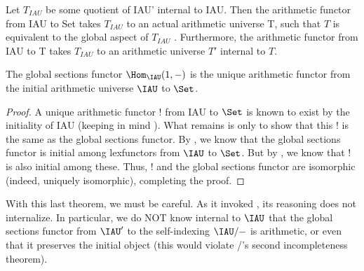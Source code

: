 Let $T_{IAU}$ be some quotient of IAU' internal to IAU. Then the arithmetic functor from IAU to Set takes $T_{IAU}$ to an actual arithmetic universe T, such that $T$ is equivalent to the global aspect of $T_{IAU}$ . Furthermore, the arithmetic functor from IAU to T takes $T_{IAU}$ to an arithmetic universe $T'$ internal to $T$.

\begin{theorem}
The global sections functor $\Hom_{\IAU}(1, -)$ is the unique arithmetic functor from the initial arithmetic universe $\IAU$ to $\Set$.
\end{theorem}
\begin{proof}
A unique arithmetic functor $!$ from IAU to $\Set$ is known to exist by the initiality of IAU (keeping in mind ). What remains is only to show that this $!$ is the same as the global sections functor. By , we know that the global sections functor is initial among lexfunctors from $\IAU$ to $\Set$. But by , we know that $!$ is also initial among these. Thus, $!$ and the global sections functor are isomorphic (indeed, uniquely isomorphic), completing the proof.
\end{proof}

With this last theorem, we must be careful. As it invoked , its reasoning does not internalize. In particular, we do NOT know internal to $\IAU$ that the global sections functor from $\IAU'$ to the self-indexing $\IAU/-$ is arithmetic, or even that it preserves the initial object (this would violate \Goedel/'s second incompleteness theorem).


